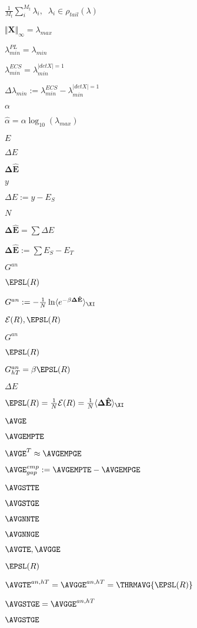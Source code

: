 $\tfrac{1}{M_{t}}\sum_{i}^{M_t}\lambda_{i},\;\;\lambda_{i}\in\rho_{tail}(\lambda)$

$\Vert\mathbf{X}\Vert_{\infty}=\lambda_{max}$

$\lambda^{PL}_{min}=\lambda_{min}$

$\lambda^{ECS}_{min}=\lambda^{|detX|=1}_{min}$

$\Delta\lambda_{min}:=\lambda^{ECS}_{min}-\lambda^{|detX|=1}_{min}$

$\alpha$

$\hat{\alpha}=\alpha\log_{10}(\lambda_{max})$

$E$

$\Delta E$

$\mathbf{\Delta \hat{E}}$

$y$

$\Delta E:=y-E_S $

$N$

$\mathbf{\Delta \hat{E}}=\sum \Delta E$

$\mathbf{\Delta \hat{E}}:=\sum E_S - E_T$

$G^{an}$

$\EPSL(R)$

$G^{an}:=-\tfrac{1}{N}\ln\langle e^{-\beta\mathbf{\Delta \hat{E}}}\rangle_{\XI}$

$\mathcal{E}(R), \EPSL(R)$

$G^{an}$

$\EPSL(R)$

$G^{an}_{hT}=\beta\EPSL(R)$

$\Delta E$

$\newline \EPSL(R)=\tfrac{1}{N}\mathcal{E}(R)=\tfrac{1}{N}\langle \mathbf{\Delta \hat{E}}\rangle_{\XI}$

$\AVGE$

$\AVGEMPTE$

$\AVGE^{T}\approx\AVGEMPGE$

$\AVGE^{emp}_{gap}:=\AVGEMPTE-\AVGEMPGE$

$\AVGSTTE$

$\AVGSTGE$

$\AVGNNTE$

$\AVGNNGE$

$\AVGTE, \AVGGE$

$\EPSL(R)$

$\newline \AVGTE^{an,hT}=\AVGGE^{an,hT}=\THRMAVG{\EPSL(R)}$

$\AVGSTGE=\AVGGE^{an,hT}$

$\AVGSTGE$

